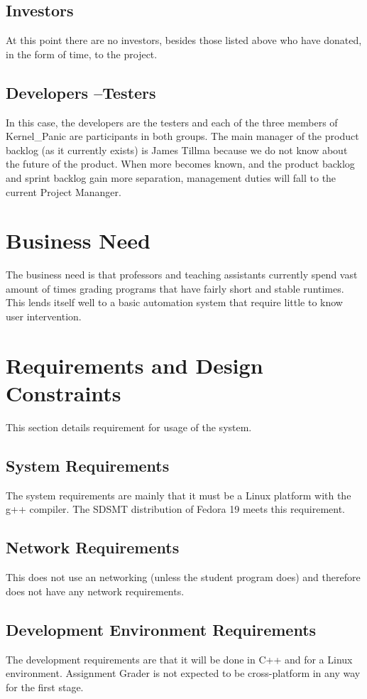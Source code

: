 \subsection{Investors}
At this point there are no investors, besides those listed above who have donated, in the form of time, to the project.


\subsection{Developers --Testers}
In this case, the developers are the testers and each of the three members of Kernel\_Panic are participants in both groups. The main manager of the product backlog (as it currently exists) is James Tillma because we do not know about the future of the product. When more becomes known, and the product backlog and sprint backlog gain more separation, management duties will fall to the current Project Mananger.


\section{Business Need}
The business need is that professors and teaching assistants currently spend vast amount of times grading programs that have fairly short and stable runtimes. This lends itself well to a basic automation system that require little to know user intervention. 

\section{Requirements and Design Constraints}
This section details requirement for usage of the system.


\subsection{System  Requirements}
The system requirements are mainly that it must be a Linux platform with the g++ compiler. The SDSMT distribution of Fedora 19 meets this requirement. 


\subsection{Network Requirements}
This does not use an networking (unless the student program does) and therefore does not have any network requirements.


\subsection{Development Environment Requirements}
The development requirements are that it will be done in C++ and for a Linux environment. Assignment Grader is not expected to be cross-platform in any way for the first stage.


